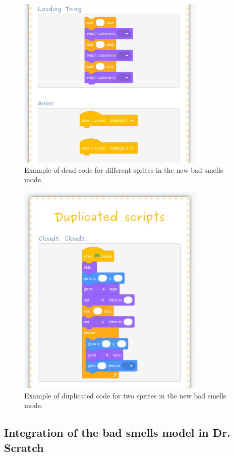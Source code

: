 \begin{figure}
    \centering
    \includegraphics[width=9cm,                         keepaspectratio]{img/dead_code.png}
    \caption{Example of dead code for different sprites in the new bad smells mode.}
    \label{fig:dead_code}
\end{figure}

\begin{figure}
    \centering
    \includegraphics[width=9cm,                         keepaspectratio]{img/dup_code.png}
    \caption{Example of duplicated code for two sprites in the new bad smells mode.}
    \label{fig:dup_code}
\end{figure}


\subsection{Integration of the bad smells model in Dr. Scratch}
\label{subsec:integration_newmodel}

